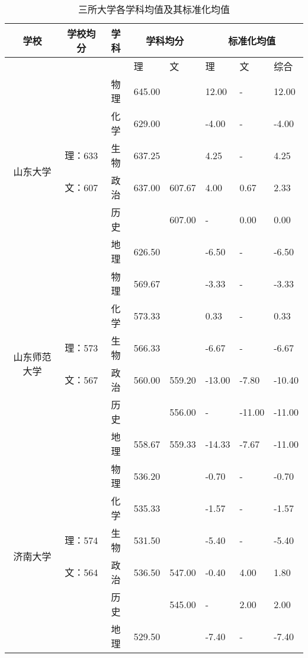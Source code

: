 \documentclass[bwprint]{cumcmthesis}
\begin{document}
	\begin{longtable}{cccp{1.5cm}p{1.5cm}p{1.5cm}p{1.5cm}p{2cm}}
		\caption{\label{tab:standard_major_line}三所大学各学科均值及其标准化均值}\\
		\toprule
		学校    & 学校均分  & 学科    & \multicolumn{2}{c}{学科均分} & \multicolumn{3}{c}{标准化均值} \\
		\midrule
		&       &       & 理     & 文     & 理     & 文     & 综合 \\
		\midrule
		\multirow{6}[1]{*}{山东大学} &       & 物理    & 645.00  &       & 12.00  & -     & 12.00  \\
		&       & 化学    & 629.00  &       & -4.00  & -     & -4.00  \\
		& 理：633 & 生物    & 637.25  &       & 4.25  & -     & 4.25  \\
		& 文：607 & 政治    & 637.00  & 607.67  & 4.00  & 0.67  & 2.33  \\
		&       & 历史    &       & 607.00  & -     & 0.00  & 0.00  \\
		&       & 地理    & 626.50  &       & -6.50  & -     & -6.50  \\
		\midrule
		\multirow{6}[1]{*}{山东师范大学} &       & 物理    & 569.67  &       & -3.33  & -     & -3.33  \\
		&       & 化学    & 573.33  &       & 0.33  & -     & 0.33  \\
		& 理：573 & 生物    & 566.33  &       & -6.67  & -     & -6.67  \\
		& 文：567 & 政治    & 560.00  & 559.20  & -13.00  & -7.80  & -10.40  \\
		&       & 历史    &       & 556.00  & -     & -11.00  & -11.00  \\
		&       & 地理    & 558.67  & 559.33  & -14.33  & -7.67  & -11.00  \\
		\midrule
		\multirow{6}[2]{*}{济南大学} &       & 物理    & 536.20  &       & -0.70  & -     & -0.70  \\
		&       & 化学    & 535.33  &       & -1.57  & -     & -1.57  \\
		& 理：574 & 生物    & 531.50  &       & -5.40  & -     & -5.40  \\
		& 文：564 & 政治    & 536.50  & 547.00  & -0.40  & 4.00  & 1.80  \\
		&       & 历史    &       & 545.00  & -     & 2.00  & 2.00  \\
		&       & 地理    & 529.50  &       & -7.40  & -     & -7.40  \\
		\bottomrule
	\end{longtable}%
\end{document}
